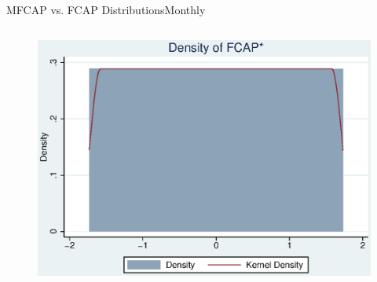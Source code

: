 \documentclass{beamer}
\begin{document}
\begin{frame}{MFCAP vs. FCAP Distributions}{Monthly}
\begin{columns}
\begin{figure}
						\includegraphics[width=\linewidth]{"MHistNFCAP.eps"}   \end{figure}            
				\end{columns}
			\end{frame}
			
			
	
\end{document}

